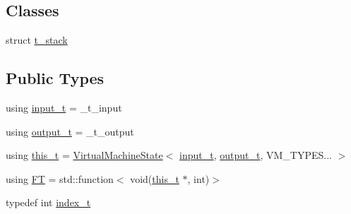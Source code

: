 \subsection*{Classes}
\begin{DoxyCompactItemize}
\item 
struct \hyperlink{struct_virtual_machine_state_1_1t__stack}{t\+\_\+stack}
\end{DoxyCompactItemize}
\subsection*{Public Types}
\begin{DoxyCompactItemize}
\item 
using \hyperlink{class_virtual_machine_state_aeb5e01ec57466fd3734e0c29f2b8da0a}{input\+\_\+t} = \+\_\+t\+\_\+input
\item 
using \hyperlink{class_virtual_machine_state_a1015cee5061f82f82ef6a953b51f9bd5}{output\+\_\+t} = \+\_\+t\+\_\+output
\item 
using \hyperlink{class_virtual_machine_state_ada0e1bebef2d73581c6adcd55f8be521}{this\+\_\+t} = \hyperlink{class_virtual_machine_state}{Virtual\+Machine\+State}$<$ \hyperlink{class_virtual_machine_state_aeb5e01ec57466fd3734e0c29f2b8da0a}{input\+\_\+t}, \hyperlink{class_virtual_machine_state_a1015cee5061f82f82ef6a953b51f9bd5}{output\+\_\+t}, V\+M\+\_\+\+T\+Y\+P\+E\+S... $>$
\item 
using \hyperlink{class_virtual_machine_state_acacd9869c4a5ff3a765f6bd7d5bae35c}{FT} = std\+::function$<$ void(\hyperlink{class_virtual_machine_state_ada0e1bebef2d73581c6adcd55f8be521}{this\+\_\+t} $\ast$, int)$>$
\item 
typedef int \hyperlink{class_virtual_machine_state_a95ba2f54f65b778c8a012ea3e7a0ee50}{index\+\_\+t}
\end{DoxyCompactItemize}

